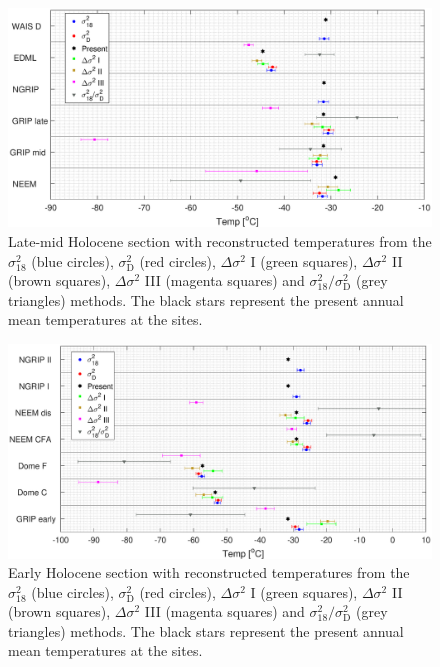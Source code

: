 \documentclass[11pt, draftcls, onecolumn]{IEEEtran} %
\numberwithin{equation}{section}
\numberwithin{table}{section}
\numberwithin{figure}{section}
\begin{document}
\begin{figure}[]
	\vspace*{2mm}
	\begin{center}
		\includegraphics[width=\textwidth]{Figure_11}
		\caption{Late-mid Holocene section with reconstructed temperatures from the $\sigma^2_{18}$ (blue circles), 
			 $\sigma^2_{\mathrm{D}}$ (red circles), $\Delta\sigma^2$ I (green squares),
			 $\Delta\sigma^2$ II (brown squares), $\Delta\sigma^2$ III (magenta squares) and
			 ${\sigma^2_{18}}/{\sigma^2_\mathrm{D}}$ (grey triangles) methods.
			The black stars represent the present annual mean temperatures at the sites.}  \label{fig:all_temps}
	\end{center}
\end{figure}



\begin{figure}[]
	\vspace*{2mm}
	\begin{center}
		\includegraphics[width=\textwidth]{Figure_12}
		\caption{Early Holocene section with reconstructed temperatures from the $\sigma^2_{18}$ (blue circles), 
			$\sigma^2_{\mathrm{D}}$ (red circles), $\Delta\sigma^2$ I (green squares),
			$\Delta\sigma^2$ II (brown squares), $\Delta\sigma^2$ III (magenta squares) and
			${\sigma^2_{18}}/{\sigma^2_\mathrm{D}}$ (grey triangles) methods.
			The black stars represent the present annual mean temperatures at the sites.}  \label{fig:early_temps}
	\end{center}
\end{figure}
\end{document}
